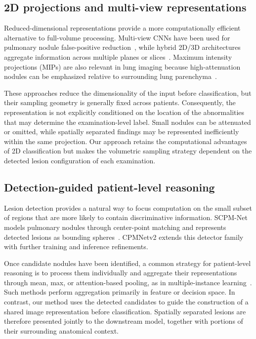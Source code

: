 \documentclass[preprint,12pt]{elsarticle}
\begin{document}
\subsection{2D projections and multi-view representations}

Reduced-dimensional representations provide a more computationally efficient alternative to full-volume processing. Multi-view CNNs have been used for pulmonary nodule false-positive reduction~\cite{setio2016multiview}, while hybrid 2D/3D architectures aggregate information across multiple planes or slices~\cite{jang2022m3t}. Maximum intensity projections (MIPs) are also relevant in lung imaging because high-attenuation nodules can be emphasized relative to surrounding lung parenchyma~\cite{zheng2020mip}.

These approaches reduce the dimensionality of the input before classification, but their sampling geometry is generally fixed across patients. Consequently, the representation is not explicitly conditioned on the location of the abnormalities that may determine the examination-level label. Small nodules can be attenuated or omitted, while spatially separated findings may be represented inefficiently within the same projection. Our approach retains the computational advantages of 2D classification but makes the volumetric sampling strategy dependent on the detected lesion configuration of each examination.

\subsection{Detection-guided patient-level reasoning}

Lesion detection provides a natural way to focus computation on the small subset of regions that are more likely to contain discriminative information. SCPM-Net models pulmonary nodules through center-point matching and represents detected lesions as bounding spheres~\cite{luo2022scpmnet}. CPMNetv2 extends this detector family with further training and inference refinements.

Once candidate nodules have been identified, a common strategy for patient-level reasoning is to process them individually and aggregate their representations through mean, max, or attention-based pooling, as in multiple-instance learning~\cite{ilse2018attention}. Such methods perform aggregation primarily in feature or decision space. In contrast, our method uses the detected candidates to guide the construction of a shared image representation before classification. Spatially separated lesions are therefore presented jointly to the downstream model, together with portions of their surrounding anatomical context.
\end{document}
